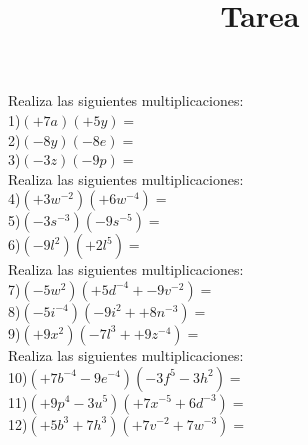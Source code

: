 \documentclass[a4paper,12pt]{article}
\title{Tarea}
\author{}
\date{}
\begin{document}
\maketitle
Realiza las siguientes multiplicaciones: \vspace{1cm}\\ 
1)$(+7a)(+5y)=$\vspace{1cm}\\ 
2)$(-8y)(-8e)=$\vspace{1cm}\\ 
3)$(-3z)(-9p)=$\vspace{1cm}\\ 
Realiza las siguientes multiplicaciones: \vspace{1cm}\\ 
4)$(+3w^{-2})(+6w^{-4} )=$\vspace{1cm}\\ 
5)$(-3s^{-3})(-9s^{-5} )=$\vspace{1cm}\\ 
6)$(-9l^{2})(+2l^{5} )=$\vspace{1cm}\\ 
Realiza las siguientes multiplicaciones: \vspace{1cm}\\ 
7)$(-5w^{2})(+5d^{-4}+-9v^{-2} )=$\vspace{1cm}\\ 
8)$(-5i^{-4})(-9i^{2}++8n^{-3} )=$\vspace{1cm}\\ 
9)$(+9x^{2})(-7l^{3}++9z^{-4} )=$\vspace{1cm}\\ 
Realiza las siguientes multiplicaciones: \vspace{1cm}\\ 
10)$(+7b^{-4}-9e^{-4} )(-3f^{5}-3h^{2} )=$\vspace{1cm}\\ 
11)$(+9p^{4}-3u^{5} )(+7x^{-5}+6d^{-3} )=$\vspace{1cm}\\ 
12)$(+5b^{3}+7h^{3} )(+7v^{-2}+7w^{-3} )=$\vspace{1cm}\\ 
\end{document}
